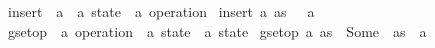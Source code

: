 \begin{isabellebody}
\isamarkupfalse%
\ insert\ {\isacharcolon}{\isacharcolon}\ {\isachardoublequoteopen}{\isacharprime}a\ {\isasymRightarrow}\ {\isacharparenleft}{\isacharprime}a\ state{\isacharparenright}\ {\isasymRightarrow}\ {\isacharparenleft}{\isacharprime}a\ operation{\isacharparenright}{\isachardoublequoteclose}\ \isanewline
{\isachardoublequoteopen}insert\ a\ as\ {\isacharequal}\ {\isacharbraceleft}\ a\ {\isacharbraceright}{\isachardoublequoteclose}\isanewline
\isanewline
{}\isamarkupfalse%
\ gset{\isacharunderscore}op\ {\isacharcolon}{\isacharcolon}\ {\isachardoublequoteopen}{\isacharparenleft}{\isacharprime}a\ operation{\isacharparenright}\ {\isasymRightarrow}\ {\isacharparenleft}{\isacharprime}a\ state{\isacharparenright}\ {\isasymrightharpoonup}\ {\isacharparenleft}{\isacharprime}a\ state{\isacharparenright}{\isachardoublequoteclose}\ \isanewline
{\isachardoublequoteopen}gset{\isacharunderscore}op\ a\ as\ {\isacharequal}\ Some\ {\isacharparenleft}\ as\ {\isasymunion}\ a\ {\isacharparenright}{\isachardoublequoteclose}
\end{isabellebody}
